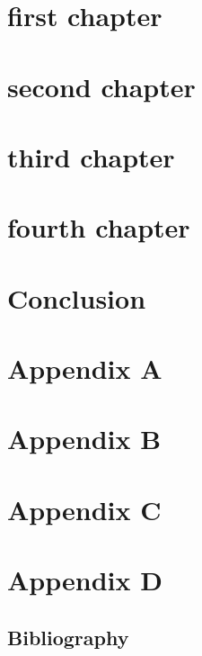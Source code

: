 \documentclass[12pt,letterpaper,oneside,final]{memoir}
\begin{document}
\chapter{first chapter} %

\chapter{second chapter} %
    
\chapter{third chapter} %

\chapter{fourth chapter} %

\chapter[Conclusion]{Conclusion}




\begin{appendices} 
\chapter{Appendix A} %

\chapter{Appendix B} %

\chapter{Appendix C} %

\chapter{Appendix D} %

\end{appendices} 

\newpage

\clearpage

\backmatter


\begin{OnehalfSpace}
\setlength{\bibitemsep}{\onelineskip}

\chapter{Bibliography}

\printindex
\end{OnehalfSpace}
\end{document}
